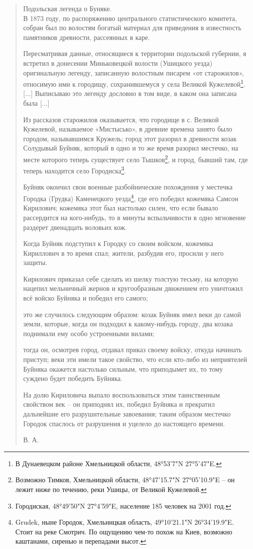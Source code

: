 \begin{quotation}
Подольская легенда о Буняке.\\

В 1873 году, по распоряжению центрального статистического комитета, собран был по волостям богатый материал для приведения в известность памятников древности, рассеянных в каре.

Пересматривая данные, относящиеся к территории подольской губернии, я встретил в донесении Миньковецкой волости (Ушицкого уезда) оригинальную легенду, записанную волостным писарем «от старожилов», относимую ими к городищу, сохранившемуся у села Великой Кужелевой\footnote{В Дунаевецком районе Хмельницкой области, 48°53'7"N 27°5'47"E.}. [...] Выписываю это легенду дословно в том виде, в каком она записана была [...]

Из рассказов старожилов оказывается, что городище в с. Великой Кужелевой, называемое «Мистысько», в древние времена занято было городом, называвшимся Кружель; город этот разорил в древности козак Солудывый Буйняк, который в одно и то же время разорил местечко, на месте которого теперь существует село Тышков\footnote{Возможно Тимков, Хмельницкой области, 48°47'15.7"N 27°05'10.9"E – он лежит ниже по течению, реки Ушицы, от Великой Кужелевой.}, и город, бывший там, где теперь находится село Городиска\footnote{Городиская, 48°49'50"N 27°4'59"E, население 185 человек на 2001 год.}.

Буйняк окончил свои военные разбойнические похождения у местечка Городка (Грудка) Каменецкого уезда\footnote{Grudek, ныне Городок, Хмельницкая область, 49°10'21.1"N 26°34'19.9"E. Стоит на реке Смотрич. По ощущению чем-то похож на Киев, возможно каштанами, сиренью и перепадами высот.}, где его победил кожемяка Самсон Кирилович; кожемяка этот был настолько силен, что если бывало рассердится на кого-нибудь, то в минуты вспыльчивости в одно мгновение раздерет двенадцать воловьих кож.

Когда Буйняк подступил к Городку со своим войском, кожемяка Кириллович в то время спал; жители, разбудив его, просили у него защиты.

Кирилович приказал себе сделать из шелку толстую тесьму, на которую нацепил мельничный жернов и кругообразным движением его уничтожил всё войско Буйняка и победил его самого;

это же случилось следующим образом: козак Буйняк имел веки до самой земли, которые, когда он подходил к какому-нибудь городу, два козака поднимали ему особо устроенными вилами;

тогда он, осмотрев город, отдавал приказ своему войску, откуда начинать приступ; веки эти имели такое свойство, что если кто-либо из неприятелей Буйняка окажется настолько сильным, что приподымет их, то тому суждено будет победить Буйняка.

На долю Кириловича выпало воспользоваться этим таинственным свойством век – он приподнял их, победил Буйняка и прекратил дальнейшие его разрушительные завоевания; таким образом местечко Городок спаслось от разрушения и уцелело до настоящего времени.

В. А.
\end{quotation}


